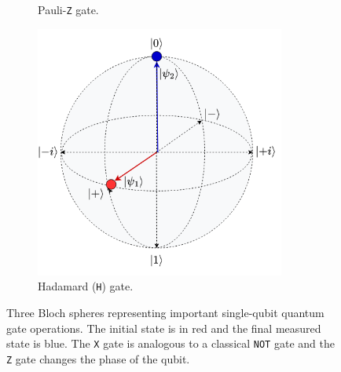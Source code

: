 \begin{figure}[ht!]
\begin{subfigure}[b]{0.28\textwidth}
		\caption{Pauli-\texttt{Z} gate.}
		\label{fig:zgatebloch}
	\end{subfigure}
	\hfill
	\begin{subfigure}[b]{0.28\textwidth}
		\centering
		\includegraphics[width=0.9\textwidth]{body/ch2/figs/hadamard-gate}
		\caption{Hadamard (\texttt{H}) gate.}
		\label{fig:hadamardbloch}
	\end{subfigure}
	\caption{Three Bloch spheres representing important single-qubit quantum gate operations. The initial state is in red and the final measured state is blue. The \texttt{X} gate is analogous to a classical \texttt{NOT} gate and the \texttt{Z} gate changes the phase of the qubit.}
	\label{fig:qgates}
\end{figure}

